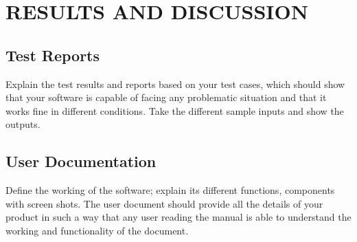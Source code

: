 
\chapter{RESULTS AND DISCUSSION} %

\label{Chapter6} %



\section{Test Reports}
Explain the test results and reports based on your test cases, which should show that your software is capable of facing any problematic situation and that it works fine in different conditions. Take the different sample inputs and show the outputs.

\section{User Documentation}
Define the working of the software; explain its different functions, components with screen shots. The user document should provide all the details of your product in such a way that any user reading the manual is able to understand the working and functionality of the document.

